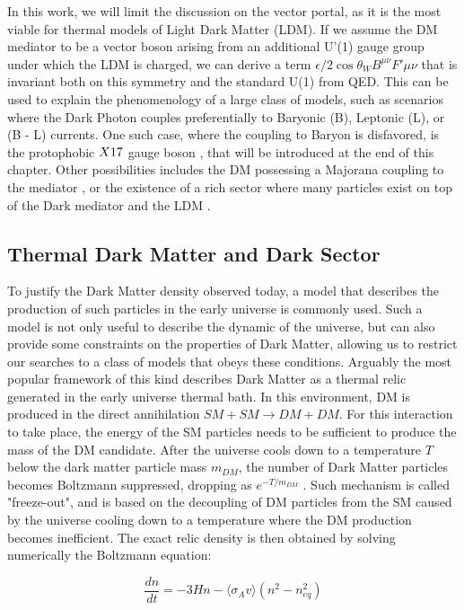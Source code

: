 In this work, we will limit the discussion on the vector portal, as it is the most viable for thermal models of Light Dark Matter (LDM). If we assume the DM mediator to be a vector boson arising from an additional U'(1) gauge group under which the LDM is charged, we can derive a term $\epsilon / 2 \cos{\theta_W} B^{\mu \nu} F'{\mu \nu}$ that is invariant both on this symmetry and the standard U(1) from QED. This can be used to explain the phenomenology of a large class of models, such as scenarios where the Dark Photon couples preferentially to Baryonic (B), Leptonic (L), or (B - L) currents. One such case, where the coupling to Baryon is disfavored, is the protophobic $X17$ gauge boson \cite{PhysRevD.95.035017}, that will be introduced at the end of this chapter. Other possibilities includes the DM possessing a Majorana coupling to the mediator \cite{PhysRevD.93.063523}, or the existence of a rich sector where many particles exist on top of the Dark mediator and the LDM \cite{Morrissey_2014}.

\subsection{Thermal Dark Matter and Dark Sector}
\label{ch1:sec:thermal-dm}

To justify the Dark Matter density observed today, a model that describes the production of such particles in the early universe is commonly used. Such a model is not only useful to describe the dynamic of the universe, but can also provide some constraints on the properties of Dark Matter, allowing us to restrict our searches to a class of models that obeys these conditions. Arguably the most popular framework of this kind describes Dark Matter as a thermal relic generated in the early universe thermal bath. In this environment, DM is produced in the direct annihilation $SM+SM \to DM+DM$. For this interaction to take place, the energy of the SM particles needs to be sufficient to produce the mass of the DM candidate. After the universe cools down to a temperature $T$ below the dark matter particle mass $m_{DM}$, the number of Dark Matter particles becomes Boltzmann suppressed, dropping as $e^{- T / m_{DM}}$ \cite{Feng:2010gw}. Such mechanism is called "freeze-out", and is based on the decoupling of DM particles from the SM caused by the universe cooling down to a temperature where the DM production becomes inefficient. The exact relic density is then obtained by solving numerically the Boltzmann equation:

  \begin{equation}
    \label{eq:boltzman-equation}
    \frac{d n}{d t} = -3 H n - \langle \sigma_A v \rangle (n^2 - n^2_{eq})
  \end{equation}

